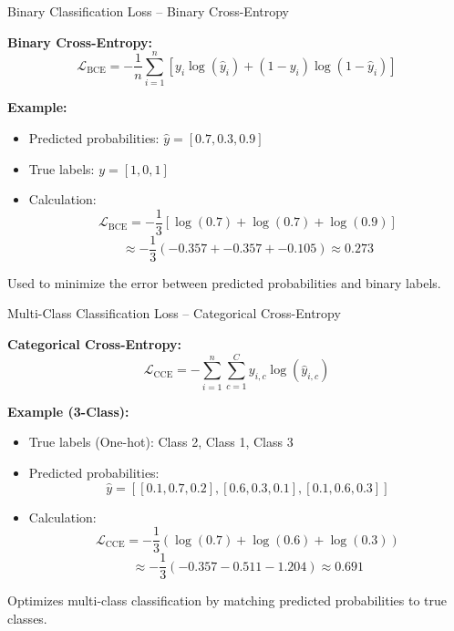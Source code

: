 \documentclass[serif, aspectratio=169]{beamer}
\begin{document}
\begin{frame}{Binary Classification Loss – Binary Cross-Entropy}

    \textbf{Binary Cross-Entropy:}
    \[
    \mathcal{L}_{\text{BCE}} = -\frac{1}{n} \sum_{i=1}^{n} \left[ y_i \log(\hat{y}_i) + (1 - y_i) \log(1 - \hat{y}_i) \right]
    \]

    \textbf{Example:}
    \begin{itemize}
        \item Predicted probabilities: \( \hat{y} = [0.7, 0.3, 0.9] \)
        \item True labels: \( y = [1, 0, 1] \)
        \item Calculation:
        \[
        \mathcal{L}_{\text{BCE}} = -\frac{1}{3} \left[ \log(0.7) + \log(0.7) + \log(0.9) \right]
        \]
        \[
        \approx -\frac{1}{3} \left( -0.357 + -0.357 + -0.105 \right) \approx 0.273
        \]
    \end{itemize}
    Used to minimize the error between predicted probabilities and binary labels.
    
\end{frame}

\begin{frame}{Multi-Class Classification Loss – Categorical Cross-Entropy}

    \textbf{Categorical Cross-Entropy:}
    \[
    \mathcal{L}_{\text{CCE}} = -\sum_{i=1}^{n} \sum_{c=1}^{C} y_{i,c} \log(\hat{y}_{i,c})
    \]

    \textbf{Example (3-Class):}
    \begin{itemize}
        \item True labels (One-hot): Class 2, Class 1, Class 3
        \item Predicted probabilities:
        \[
        \hat{y} = \left[ [0.1, 0.7, 0.2], [0.6, 0.3, 0.1], [0.1, 0.6, 0.3] \right]
        \]
        \item Calculation:
        \[
        \mathcal{L}_{\text{CCE}} = -\frac{1}{3} \left( \log(0.7) + \log(0.6) + \log(0.3) \right)
        \]
        \[
        \approx -\frac{1}{3} (-0.357 - 0.511 - 1.204) \approx 0.691
        \]
    \end{itemize}
    Optimizes multi-class classification by matching predicted probabilities to true classes.
    
\end{frame}


    
\end{document}
